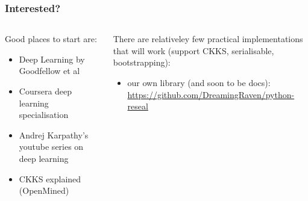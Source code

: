 \documentclass[aspectratio=169]{beamer}
\begin{document}
  \begin{frame}
    \frametitle{Interested?}
    \begin{columns}
      \begin{column}{0.5\textwidth}
        Good places to start are:
        \begin{itemize}
            \item Deep Learning by Goodfellow et al \autocite{Goodfellow-et-al-2016}
            \item Coursera deep learning specialisation
            \item Andrej Karpathy's youtube series on deep learning \autocite{andrejkarpathy}
            \item CKKS explained (OpenMined) \autocite{openmined}
        \end{itemize}
      \end{column}
      \begin{column}{0.5\textwidth}
        There are relativeley few practical implementations that will work (support CKKS, serialisable, bootstrapping):
        \begin{itemize}
            \item our own library (and soon to be docs): \url{https://github.com/DreamingRaven/python-reseal} 
        \end{itemize}
      \end{column}
    \end{columns}
  \end{frame}
\end{document}
